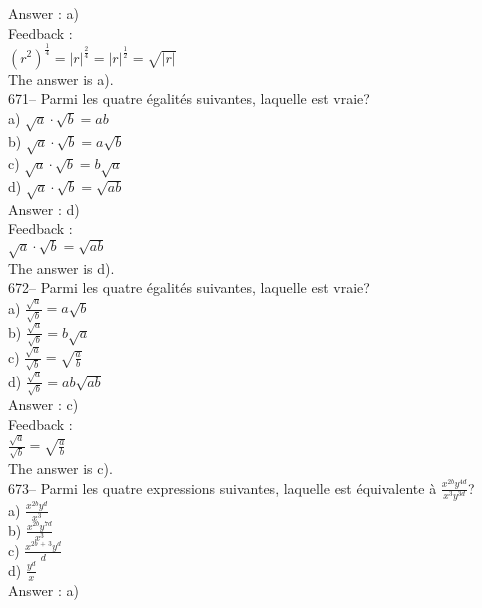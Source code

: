 ﻿\documentclass[letterpaper, 12pt]{article}
\begin{document}
Answer : a)\\

Feedback : \\
$\left( r^{2}\right)^\frac{1}{4}=|r|^\frac{2}{4}=|r|^\frac{1}{2}=\sqrt{|r|}$\\
The answer is a).\\

671-- Parmi les quatre \'egalit\'es suivantes, laquelle est vraie?\\
a) $\sqrt{a}\cdot\sqrt{b}=ab$\\
b) $\sqrt{a}\cdot\sqrt{b}=a\sqrt{b}$\\
c) $\sqrt{a}\cdot\sqrt{b}=b\sqrt{a}$\\
d) $\sqrt{a}\cdot\sqrt{b}=\sqrt{ab}$\\

Answer : d)\\

Feedback : \\
$\sqrt{a}\cdot\sqrt{b}=\sqrt{ab}$\\
The answer is d).\\

672-- Parmi les quatre \'egalit\'es suivantes, laquelle est vraie?\\
a) $\frac{\sqrt{a}}{\sqrt{b}}=a\sqrt{b}$\\[2mm]
b) $\frac{\sqrt{a}}{\sqrt{b}}=b\sqrt{a}$\\[2mm]
c) $\frac{\sqrt{a}}{\sqrt{b}}=\sqrt{\frac{a}{b}}$\\[2mm]
d) $\frac{\sqrt{a}}{\sqrt{b}}=ab\sqrt{ab}$\\

Answer : c)\\

Feedback : \\[2mm]
$\frac{\sqrt{a}}{\sqrt{b}}=\sqrt{\frac{a}{b}}$\\[2mm]
The answer is c).\\

673-- Parmi les quatre expressions suivantes, laquelle est \'equivalente \`a
$\frac{x^{2b}y^{4d}}{x^{3}y^{3d}}$?\\
a) $\frac{x^{2b}y^{d}}{x^{3}}$\\[2mm]
b) $\frac{x^{2b}y^{7d}}{x^{3}}$\\[2mm]
c) $\frac{x^{2b\,+\,3}y^{d}}{d}$\\[2mm]
d) $\frac{y^{d}}{x}$\\

Answer : a)\\
\end{document}
